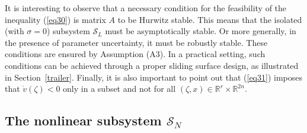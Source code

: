 \documentclass[twocolumn]{autarc_LH}
\newcommand{\Rf}{{\mathbb R}}
\begin{document}
It is interesting to observe that a necessary condition for the feasibility of the inequality (\ref{eq30}) is matrix $A$ to be Hurwitz stable. This means that the isolated (with $\sigma=0$) subsystem $\mathcal{S}_L$ must be asymptotically stable. Or more generally, in the presence of parameter uncertainty, it must be robustly stable. These conditions are ensured by
Assumption (A3). In a practical setting, such conditions can be achieved through a proper sliding surface design, as illustrated in Section~\ref{trailer}. Finally, it is also important to point out that (\ref{eq31}) imposes that $\dot v(\zeta)<0$ only in a subset and not for all $(\zeta, x) \in \Rf^r \times \Rf^{2n}$.


\subsection{The nonlinear subsystem $\mathcal{S}_N$}
\end{document}
